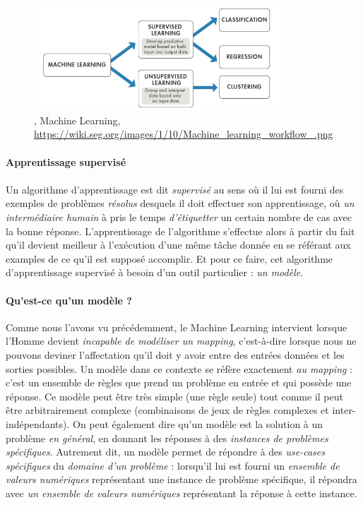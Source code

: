 \begin{figure}[h]
    \centering
    \includegraphics[width=350px]{chapters/03/images/machine-learning.png}
    \caption{\label{machine learning}, Machine Learning, \url{https://wiki.seg.org/images/1/10/Machine_learning_workflow_.png}}
\end{figure}

\paragraph{Apprentissage supervisé}

\paragraph{} Un algorithme d'apprentissage est dit \emph{supervisé} au sens où il lui est fourni des exemples de problèmes \emph{résolus} desquels
il doit effectuer son apprentissage, où \emph{un intermédiaire humain} à pris le temps \emph{d'étiquetter} un certain nombre de cas avec la bonne réponse.
L'apprentissage de l'algorithme s'effectue alors à partir du fait qu'il devient meilleur à l'exécution d'une même tâche donnée en se référant aux examples
de ce qu'il est supposé accomplir. Et pour ce faire, cet algorithme d'apprentissage supervisé à besoin d'un outil particulier : \emph{un modèle}.

\paragraph{Qu'est-ce qu'un modèle ?} Comme nous l'avons vu précédemment, le Machine Learning intervient lorsque l'Homme devient \emph{incapable de modéliser un mapping},
c'est-à-dire lorsque nous ne pouvons deviner l'affectation qu'il doit y avoir entre des entrées données et les sorties possibles. Un modèle dans ce contexte se réfère 
exactement \emph{au mapping} : c'est un ensemble de règles que prend un problème en entrée et qui possède une réponse. Ce modèle peut être très simple (une règle seule)
tout comme il peut être arbitrairement complexe (combinaisons de jeux de règles complexes et inter-indépendants). On peut également dire qu'un modèle est la solution à un problème
\emph{en général}, en donnant les réponses à des \emph{instances de problèmes spécifiques}. Autrement dit, un modèle permet de répondre à des \emph{use-cases spécifiques} du
\emph{domaine d'un problème} \cite{Internet3} : lorsqu'il lui est fourni un \emph{ensemble de valeurs numériques} représentant une instance de problème spécifique, il répondra
avec \emph{un ensemble de valeurs numériques} représentant la réponse à cette instance.

